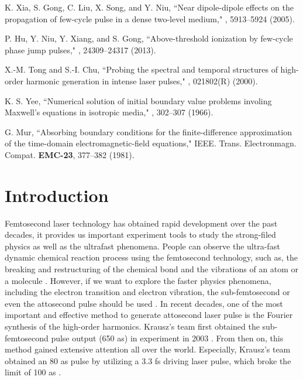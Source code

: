\documentclass[10pt,letterpaper]{article}
\begin{document}
\begin{thebibliography}{99}
K. Xia, S. Gong, C. Liu, X. Song, and Y. Niu, ``Near dipole-dipole effects on the propagation of few-cycle pulse in a dense two-level medium," , 5913--5924 (2005).


P. Hu, Y. Niu, Y. Xiang, and S. Gong, ``Above-threshold ionization by few-cycle phase jump pulses," , 24309--24317 (2013).

X.-M. Tong and S.-I. Chu, ``Probing the spectral and temporal structures of high-order harmonic generation in intense laser pulses," , 021802(R) (2000).

K. S. Yee, ``Numerical solution of initial boundary value problems involing Maxwell's equations in isotropic media," , 302--307 (1966).

G. Mur, ``Absorbing boundary conditions for the finite-difference approximation of the time-domain electromagnetic-field equations," IEEE. Trans. Electronmagn. Compat. {\bf EMC-23}, 377--382 (1981).
	
\end{thebibliography}

\section{Introduction}
Femtosecond laser technology has obtained rapid development over the past decades, it provides us important experiment tools to study the strong-filed physics as well as the ultrafast phenomena. People can observe the ultra-fast dynamic chemical reaction process using the femtosecond technology, such as, the breaking and restructuring of the chemical bond \cite{Mokhtari-chemical-bond-Nature-1990} and the vibrations of an atom or a molecule \cite{Ergler-Vibration-PRL-2006}. However, if we want to explore the faster physics phenomena, including the electron transition and electron vibration, the sub-femtosecond or even the attosecond pulse should be used \cite{Uiberacker-Attosecond-real-time-Nature-2007}. In recent decades, one of the most important and effective method to generate attosecond laser pulse is the Fourier synthesis of the high-order harmonics. Krausz's team first obtained the sub-femtosecond pulse output (650 as) in experiment in 2003 \cite{Krausz-Attosecon-Review-2009}. From then on, this method gained extensive attention all over the world. Especially, Krausz's team obtained an 80 as pulse by utilizing a 3.3 fs driving laser pulse, which broke the limit of 100 as \cite{Krausz-Attosecon-Review-2009}.
\end{document}

